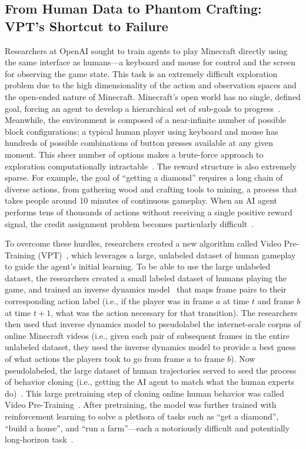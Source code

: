 \subsection{From Human Data to Phantom Crafting: VPT's Shortcut to Failure~\citep{baker2022video}}
\label{sec:vpt}

Researchers at OpenAI sought to train agents to play Minecraft directly using the same interface as humans---a keyboard and mouse for control and the screen for observing the game state.
This task is an extremely difficult exploration problem due to the high dimensionality of the action and observation spaces and the open-ended nature of Minecraft.
Minecraft's open world has no single, defined goal, forcing an agent to develop a hierarchical set of sub-goals to progress~\citep{baker2022video}. 
Meanwhile, the environment is composed of a near-infinite number of possible block configurations; a typical human player using keyboard and mouse has hundreds of possible combinations of button presses available at any given moment.
This sheer number of options makes a brute-force approach to exploration computationally intractable~\citep{guss2021robustdomainagnosticreinforcement}. 
The reward structure is also extremely sparse. 
For example, the goal of ``getting a diamond'' requires a long chain of diverse actions, from gathering wood and crafting tools to mining, a process that takes people around 10 minutes of continuous gameplay. 
When an AI agent performs tens of thousands of actions without receiving a single positive reward signal, the credit assignment problem becomes particularly difficult~\citep{guss2021minerl2019competitionsample}.

To overcome these hurdles, researchers created a new algorithm called Video Pre-Training (VPT)~\citep{baker2022video}, which leverages a large, unlabeled dataset of human gameplay to guide the agent's initial learning.
To be able to use the large unlabeled dataset, the researchers created a small labeled dataset of humans playing the game, and trained an inverse dynamics model~\citep{nguyentuong2008learning} that maps frame pairs to their corresponding action label (i.e., if the player was in frame $a$ at time $t$ and frame $b$ at time $t+1$, what was the action necessary for that transition).
The researchers then used that inverse dynamics model to pseudolabel the internet-scale corpus of online Minecraft videos (i.e., given each pair of subsequent frames in the entire unlabeled dataset, they used the inverse dynamics model to provide a best guess of what actions the players took to go from frame $a$ to frame $b$).
Now pseudolabeled, the large dataset of human trajectories served to seed the process of behavior cloning (i.e., getting the AI agent to match what the human experts do)~\citep{ross2011reductionimitationlearningstructured}. 
This large pretraining step of cloning online human behavior was called Video Pre-Training~\citep{baker2022video}. 
After pretraining, the model was further trained with reinforcement learning to solve a plethora of tasks such as ``get a diamond'', ``build a house'', and ``run a farm''---each a notoriously difficult and potentially long-horizon task~\citep{fan2022minedojo, guss2021minerl2020competitionsample}.

